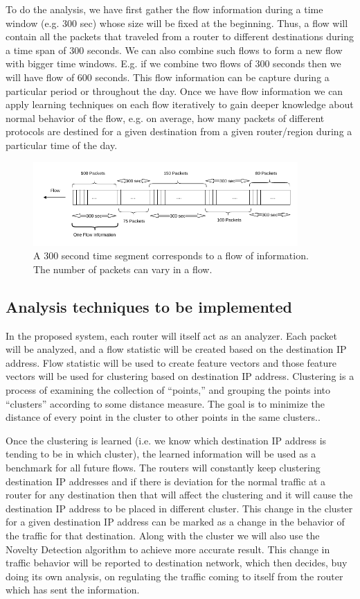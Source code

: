 \documentclass[12pt,oneside,a4paper]{article}
\begin{document}
To do the analysis, we have first gather the flow information during a time window (e.g. 300 sec) whose size will be fixed at the beginning. Thus, a flow will contain all the packets that traveled from a router to different destinations during a time span of 300 seconds. We can also combine such flows to form a new flow with bigger time windows. E.g. if we combine two flows of 300 seconds then we will have flow of 600 seconds. This flow information can be capture during a particular period or throughout the day. Once we have flow information we can apply learning techniques on each flow iteratively to gain deeper knowledge about normal behavior of the flow, e.g. on average, how many packets of different protocols are destined for a given destination from a given router/region during a particular time of the day.

\begin{figure}[H]
\centering
\includegraphics[width=0.90\textwidth]{Data_Flow_Capture.png}
\caption{A 300 second time segment corresponds to a flow of information. The number of packets can vary in a flow.} \label{fig:flow}
\end{figure}

\subsection{Analysis techniques to be implemented}
In the proposed system, each router will itself act as an analyzer. Each packet will be analyzed, and a flow statistic will be created based on the destination IP address. Flow statistic will be used to create feature vectors and those feature vectors will be used for clustering based on destination IP address. Clustering is a process of examining the collection of “points,” and grouping the points into “clusters” according to some distance measure. The goal is to minimize the distance of every point in the cluster to other points in the same clusters.\cite{machine-learning}.

Once the clustering is learned (i.e. we know which destination IP address is tending to be in which cluster), the learned information will be used as a benchmark for all future flows. The routers will constantly keep clustering destination IP addresses and if there is deviation for the normal traffic at a router for any destination then that will affect the clustering and it will cause the destination IP address to be placed in different cluster. This change in the cluster for a given destination IP address can be marked as a change in the behavior of the traffic for that destination. Along with the cluster we will also use the Novelty Detection algorithm to achieve more accurate result. This change in traffic behavior will be reported to destination network, which then decides, buy doing its own analysis, on regulating the traffic coming to itself from the router which has sent the information.
\pagebreak
\end{document}
